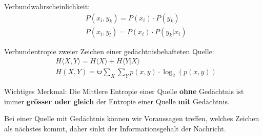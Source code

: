 Verbundwahrscheinlichkeit:
\begin{align*}
	&P(x_i, y_k) = P(x_i) \cdot P(y_k) \\
	&P(x_i, y_l) = P(x_i) \cdot P(y_k|x_i)
\end{align*}

Verbundentropie zweier Zeichen einer gedächtnisbehafteten Quelle:
\begin{align*}
	&H \langle X,Y \rangle = H \langle X \rangle + H \langle Y|X \rangle \\
	&H(X,Y) = \uminus \sum_X \sum_Y p(x,y) \cdot \log_2\left(p(x,y)\right)
\end{align*}

Wichtiges Merkmal: Die Mittlere Entropie einer Quelle \textbf{ohne} Gedächtnis
ist immer \textbf{grösser oder gleich} der Entropie einer Quelle \textbf{mit}
Gedächtnis.

Bei einer Quelle mit Gedächtnis können wir Voraussagen treffen, welches Zeichen
als nächstes kommt, daher sinkt der Informationsgehalt der Nachricht.
